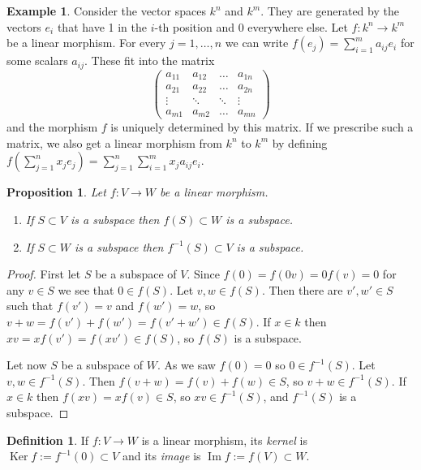 \documentclass[11pt]{article}
\newtheorem{prop}[theo]{Proposition}
\theoremstyle{definition}
\newtheorem{defi}[theo]{Definition}
\newtheorem{exam}[theo]{Example}
\DeclareMathOperator{\Ker}{Ker}
\DeclareMathOperator{\Img}{Im}
\begin{document}
\begin{exam}
Consider the vector spaces $k^n$ and $k^m$.
They are generated by the vectors $e_i$ that have 1 in the $i$-th position and 0 everywhere else.
Let $f : k^n \to k^m$ be a linear morphism.
For every $j = 1, \ldots, n$ we can write $f(e_j) = \sum_{i=1}^m a_{ij} e_i$ for some scalars $a_{ij}$.
These fit into the matrix
\[
\begin{pmatrix}
a_{11} & a_{12} & \ldots & a_{1n}
\\
a_{21} & a_{22} & \ldots & a_{2n}
\\
\vdots & \ddots & \ddots & \vdots
\\
a_{m1} & a_{m2} & \ldots & a_{mn}
\end{pmatrix}
\]
and the morphism $f$ is uniquely determined by this matrix.
If we prescribe such a matrix, we also get a linear morphism from $k^n$ to $k^m$ by defining $f(\sum_{j=1}^n x_j e_j) = \sum_{j=1}^{n} \sum_{i=1}^m x_j a_{ij} e_i$.
\end{exam}


\begin{prop}
Let $f : V \to W$ be a linear morphism.
\begin{enumerate}
\item
If $S \subset V$ is a subspace then $f(S) \subset W$ is a subspace.

\item
If $S \subset W$ is a subspace then $f^{-1}(S) \subset V$ is a subspace.
\end{enumerate}
\end{prop}

\begin{proof}
First let $S$ be a subspace of $V$.
Since $f(0) = f(0 v) = 0 f(v) = 0$ for any $v \in S$ we see that $0 \in f(S)$.
Let $v,w \in f(S)$.
Then there are $v',w' \in S$ such that $f(v') = v$ and $f(w') = w$, so $v + w = f(v') + f(w') = f(v' + w') \in f(S)$.
If $x\in k$ then $xv = xf(v') = f(xv') \in f(S)$, so $f(S)$ is a subspace.

Let now $S$ be a subspace of $W$.
As we saw $f(0) = 0$ so $0 \in f^{-1}(S)$.
Let $v,w \in f^{-1}(S)$.
Then $f(v + w) = f(v) + f(w) \in S$, so $v + w \in f^{-1}(S)$.
If $x \in k$ then $f(xv) = xf(v) \in S$, so $xv \in f^{-1}(S)$, and $f^{-1}(S)$ is a subspace.
\end{proof}


\begin{defi}
If $f : V \to W$ is a linear morphism, its \emph{kernel} is $\Ker f := f^{-1}(0) \subset V$ and its \emph{image} is $\Img f := f(V) \subset W$.
\end{defi}
\end{document}
